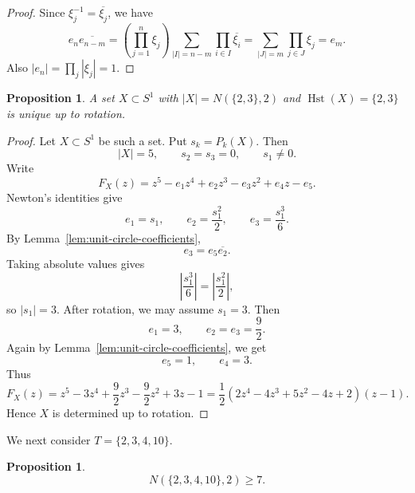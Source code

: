 \documentclass{amsart}
\newtheorem{prop}[thm]{Proposition}
\theoremstyle{definition}
\DeclareMathOperator{\Hst}{Hst}
\begin{document}
\begin{proof}
Since \(\xi_j^{-1}=\overline{\xi_j}\), we have
\[
e_n\overline{e_{n-m}}
=
\left(\prod_{j=1}^n\xi_j\right)
\sum_{|I|=n-m}\prod_{i\in I}\overline{\xi_i}
=
\sum_{|J|=m}\prod_{j\in J}\xi_j
=
e_m.
\]
Also \(|e_n|=\prod_j|\xi_j|=1\).
\end{proof}

\begin{prop}\label{prop:unique23}
A set \(X\subset S^1\) with \(|X|=N(\{2,3\},2)\) and
\(\Hst(X)=\{2,3\}\) is unique up to rotation.
\end{prop}

\begin{proof}
Let \(X\subset S^1\) be such a set.  Put \(s_k=P_k(X)\).  Then
\[
|X|=5,\qquad s_2=s_3=0,\qquad s_1\neq0.
\]
Write
\[
F_X(z)=z^5-e_1z^4+e_2z^3-e_3z^2+e_4z-e_5.
\]
Newton's identities give
\[
e_1=s_1,\qquad
e_2=\frac{s_1^2}{2},\qquad
e_3=\frac{s_1^3}{6}.
\]
By Lemma~\ref{lem:unit-circle-coefficients},
\[
e_3=e_5\overline{e_2}.
\]
Taking absolute values gives
\[
\left|\frac{s_1^3}{6}\right|
=
\left|\frac{s_1^2}{2}\right|,
\]
so \(|s_1|=3\).  After rotation, we may assume \(s_1=3\).  Then
\[
e_1=3,\qquad e_2=e_3=\frac92.
\]
Again by Lemma~\ref{lem:unit-circle-coefficients}, we get
\[
e_5=1,\qquad e_4=3.
\]
Thus
\[
F_X(z)=z^5-3z^4+\frac92z^3-\frac92z^2+3z-1=\frac{1}{2}(2z^4-4z^3+5z^2-4z+2)(z-1).
\]%
Hence \(X\) is determined up to rotation.
\end{proof}

We next consider \(T=\{2,3,4,10\}\).

\begin{prop}\label{prop:23410-lower}
\[
N(\{2,3,4,10\},2)\ge7.
\]
\end{prop}
\end{document}
